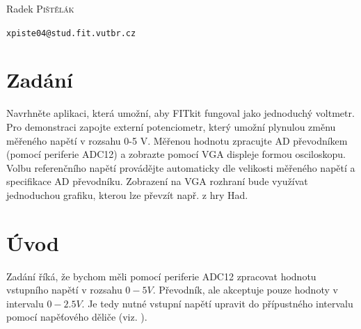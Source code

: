 \documentclass[a4paper, 11pt, titlepage]{article}
\begin{document}
\begin{titlepage}
\begin{center}

	\noindent
	\begin{minipage}{0.4\textwidth}
		\begin{flushleft} \large
			Radek \textsc{Pištělák}
		\end{flushleft}
	\end{minipage}%
	\begin{minipage}{0.4\textwidth}
		\begin{flushright} \large
			\texttt{xpiste04@stud.fit.vutbr.cz}
		\end{flushright}
	\end{minipage}

\end{center}
\end{titlepage}


\pagestyle{plain}
\setcounter{page}{1}

\section{Zadání} %
\label{sub:zadani}
	Navrhněte aplikaci, která umožní, aby FITkit fungoval jako jednoduchý voltmetr. 
	Pro demonstraci zapojte externí potenciometr, který umožní plynulou změnu měřeného 
	napětí v rozsahu 0-5 V. Měřenou hodnotu zpracujte AD převodníkem (pomocí periferie ADC12) a 
	zobrazte pomocí VGA displeje formou osciloskopu. Volbu referenčního napětí provádějte 
	automaticky dle velikosti měřeného napětí a specifikace AD převodníku. Zobrazení na VGA 
	rozhraní bude využívat jednoduchou grafiku, kterou lze převzít např. z hry Had.

\section{Úvod} %
\label{sec:Uvod}
	Zadání říká, že bychom měli pomocí periferie ADC12 zpracovat hodnotu vstupního napětí
	v rozsahu $0-5V$. Převodník, ale akceptuje pouze hodnoty v intervalu 
	$0 - 2.5V$. Je tedy nutné vstupní napětí upravit do přípustného intervalu pomocí 
	napěťového děliče (viz. \cite{wiki:Delic}). 
\end{document}

